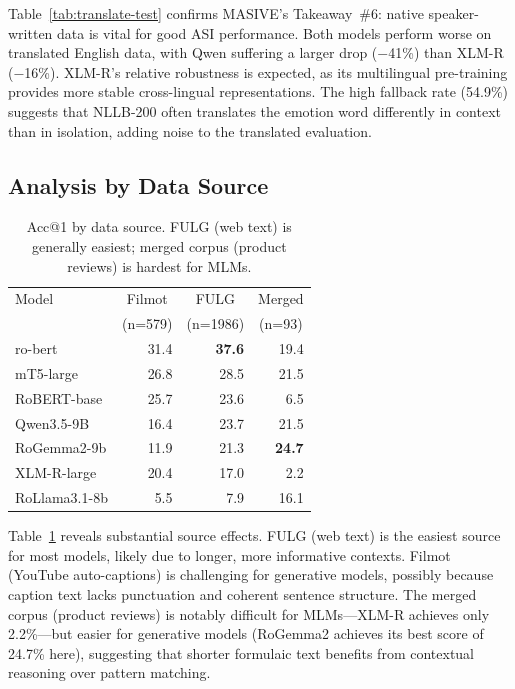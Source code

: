 \documentclass[11pt]{article}
\begin{document}
Table~\ref{tab:translate-test} confirms MASIVE's Takeaway~\#6: native speaker-written data is vital for good ASI performance. Both models perform worse on translated English data, with Qwen suffering a larger drop ($-$41\%) than XLM-R ($-$16\%). XLM-R's relative robustness is expected, as its multilingual pre-training provides more stable cross-lingual representations. The high fallback rate (54.9\%) suggests that NLLB-200 often translates the emotion word differently in context than in isolation, adding noise to the translated evaluation.

\subsection{Analysis by Data Source}

\begin{table}[t]
    \centering
    \small
    \begin{tabular}{lrrr}
        \toprule
        Model & \multicolumn{1}{c}{Filmot} & \multicolumn{1}{c}{FULG} & \multicolumn{1}{c}{Merged} \\
        & \multicolumn{1}{c}{(n=579)} & \multicolumn{1}{c}{(n=1986)} & \multicolumn{1}{c}{(n=93)} \\
        \midrule
        ro-bert & 31.4 & \textbf{37.6} & 19.4 \\
        mT5-large & 26.8 & 28.5 & 21.5 \\
        RoBERT-base & 25.7 & 23.6 & 6.5 \\
        Qwen3.5-9B & 16.4 & 23.7 & 21.5 \\
        RoGemma2-9b & 11.9 & 21.3 & \textbf{24.7} \\
        XLM-R-large & 20.4 & 17.0 & 2.2 \\
        RoLlama3.1-8b & 5.5 & 7.9 & 16.1 \\
        \bottomrule
    \end{tabular}
    \caption{Acc@1 by data source. FULG (web text) is generally easiest; merged corpus (product reviews) is hardest for MLMs.}
    \label{tab:by-source}
\end{table}

Table~\ref{tab:by-source} reveals substantial source effects. FULG (web text) is the easiest source for most models, likely due to longer, more informative contexts. Filmot (YouTube auto-captions) is challenging for generative models, possibly because caption text lacks punctuation and coherent sentence structure. The merged corpus (product reviews) is notably difficult for MLMs---XLM-R achieves only 2.2\%---but easier for generative models (RoGemma2 achieves its best score of 24.7\% here), suggesting that shorter formulaic text benefits from contextual reasoning over pattern matching.
\end{document}
